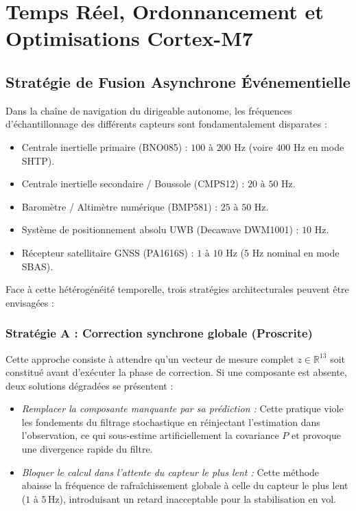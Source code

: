 \documentclass[../Implementation.tex]{subfiles}
\begin{document}
\section{Temps Réel, Ordonnancement et Optimisations Cortex-M7}

\subsection{Stratégie de Fusion Asynchrone Événementielle}

Dans la chaîne de navigation du dirigeable autonome, les fréquences d'échantillonnage des différents capteurs sont fondamentalement disparates :
\begin{itemize}
    \item Centrale inertielle primaire (BNO085) : $100\text{ à }200\text{ Hz}$ (voire $400\text{ Hz}$ en mode SHTP).
    \item Centrale inertielle secondaire / Boussole (CMPS12) : $20\text{ à }50\text{ Hz}$.
    \item Baromètre / Altimètre numérique (BMP581) : $25\text{ à }50\text{ Hz}$.
    \item Système de positionnement absolu UWB (Decawave DWM1001) : $10\text{ Hz}$.
    \item Récepteur satellitaire GNSS (PA1616S) : $1\text{ à }10\text{ Hz}$ ($5\text{ Hz}$ nominal en mode SBAS).
\end{itemize}

Face à cette hétérogénéité temporelle, trois stratégies architecturales peuvent être envisagées :

\subsubsection{Stratégie A : Correction synchrone globale (Proscrite)}
Cette approche consiste à attendre qu'un vecteur de mesure complet $z \in \mathbb{R}^{13}$ soit constitué avant d'exécuter la phase de correction. Si une composante est absente, deux solutions dégradées se présentent :
\begin{itemize}
    \item \textit{Remplacer la composante manquante par sa prédiction :} Cette pratique viole les fondements du filtrage stochastique en réinjectant l'estimation dans l'observation, ce qui sous-estime artificiellement la covariance $P$ et provoque une divergence rapide du filtre.
    \item \textit{Bloquer le calcul dans l'attente du capteur le plus lent :} Cette méthode abaisse la fréquence de rafraîchissement globale à celle du capteur le plus lent ($1\text{ à }5\,\text{Hz}$), introduisant un retard inacceptable pour la stabilisation en vol.
\end{itemize}
\end{document}
